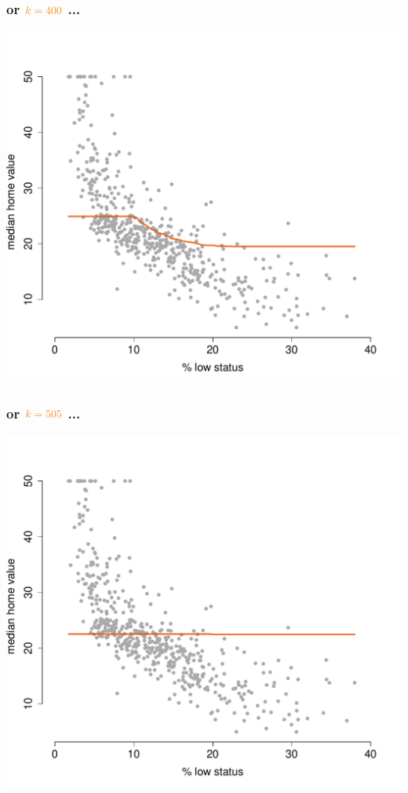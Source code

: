 \documentclass{beamer}
\newcommand{\bo}[1]{\textcolor{burntorange}{#1}}
\begin{document}
\begin{frame}[plain]
\frametitle{or $\bo{k=400}$ ...}
\vspace{-8mm}
\begin{center}
\includegraphics[scale=.44]{DaveBostonplotk=400i=9.pdf}
\end{center}
\end{frame}

\begin{frame}[plain]
\frametitle{or $\bo{k=505}$ ...}
\vspace{-8mm}
\begin{center}
\includegraphics[scale=.44]{DaveBostonplotk=505i=10.pdf}
\end{center}
\end{frame}
\end{document}
